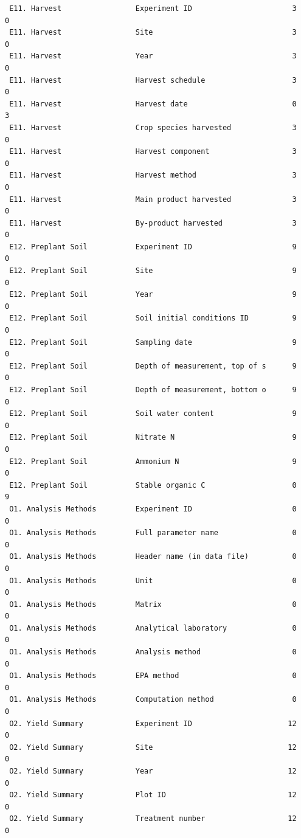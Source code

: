 \documentclass[
]{article}
\begin{document}
\begin{verbatim}
 E11. Harvest                 Experiment ID                       3       0
 E11. Harvest                 Site                                3       0
 E11. Harvest                 Year                                3       0
 E11. Harvest                 Harvest schedule                    3       0
 E11. Harvest                 Harvest date                        0       3
 E11. Harvest                 Crop species harvested              3       0
 E11. Harvest                 Harvest component                   3       0
 E11. Harvest                 Harvest method                      3       0
 E11. Harvest                 Main product harvested              3       0
 E11. Harvest                 By-product harvested                3       0
 E12. Preplant Soil           Experiment ID                       9       0
 E12. Preplant Soil           Site                                9       0
 E12. Preplant Soil           Year                                9       0
 E12. Preplant Soil           Soil initial conditions ID          9       0
 E12. Preplant Soil           Sampling date                       9       0
 E12. Preplant Soil           Depth of measurement, top of s      9       0
 E12. Preplant Soil           Depth of measurement, bottom o      9       0
 E12. Preplant Soil           Soil water content                  9       0
 E12. Preplant Soil           Nitrate N                           9       0
 E12. Preplant Soil           Ammonium N                          9       0
 E12. Preplant Soil           Stable organic C                    0       9
 O1. Analysis Methods         Experiment ID                       0       0
 O1. Analysis Methods         Full parameter name                 0       0
 O1. Analysis Methods         Header name (in data file)          0       0
 O1. Analysis Methods         Unit                                0       0
 O1. Analysis Methods         Matrix                              0       0
 O1. Analysis Methods         Analytical laboratory               0       0
 O1. Analysis Methods         Analysis method                     0       0
 O1. Analysis Methods         EPA method                          0       0
 O1. Analysis Methods         Computation method                  0       0
 O2. Yield Summary            Experiment ID                      12       0
 O2. Yield Summary            Site                               12       0
 O2. Yield Summary            Year                               12       0
 O2. Yield Summary            Plot ID                            12       0
 O2. Yield Summary            Treatment number                   12       0

\end{verbatim}
\end{document}
